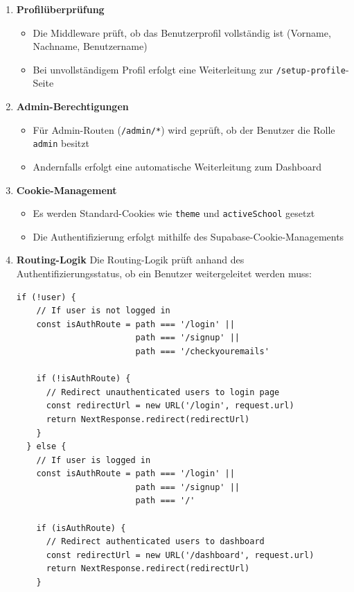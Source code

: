 \begin{inhalt}
\begin{enumerate}[label=\textbf{\arabic*.}]
  \item \textbf{Profilüberprüfung}
  \begin{itemize}
    \item Die Middleware prüft, ob das Benutzerprofil vollständig ist (Vorname, Nachname, Benutzername)
    \item Bei unvollständigem Profil erfolgt eine Weiterleitung zur \texttt{/setup-profile}-Seite
  \end{itemize}

  \item \textbf{Admin-Berechtigungen}
  \begin{itemize}
    \item Für Admin-Routen (\texttt{/admin/*}) wird geprüft, ob der Benutzer die Rolle \texttt{admin} besitzt
    \item Andernfalls erfolgt eine automatische Weiterleitung zum Dashboard
  \end{itemize}

  \item \textbf{Cookie-Management}
  \begin{itemize}
    \item Es werden Standard-Cookies wie \texttt{theme} und \texttt{activeSchool} gesetzt
    \item Die Authentifizierung erfolgt mithilfe des Supabase-Cookie-Managements
  \end{itemize}

\newpage

  \item \textbf{Routing-Logik}
  Die Routing-Logik prüft anhand des Authentifizierungsstatus, ob ein Benutzer weitergeleitet werden muss:


\begin{lstlisting}[style=mytsx]
  if (!user) {
    // If user is not logged in
    const isAuthRoute = path === '/login' || 
                        path === '/signup' || 
                        path === '/checkyouremails'
    
    if (!isAuthRoute) {
      // Redirect unauthenticated users to login page
      const redirectUrl = new URL('/login', request.url)
      return NextResponse.redirect(redirectUrl)
    }
  } else {
    // If user is logged in
    const isAuthRoute = path === '/login' || 
                        path === '/signup' || 
                        path === '/'
    
    if (isAuthRoute) {
      // Redirect authenticated users to dashboard
      const redirectUrl = new URL('/dashboard', request.url)
      return NextResponse.redirect(redirectUrl)
    }


\end{lstlisting}
\end{enumerate}
\end{inhalt}
